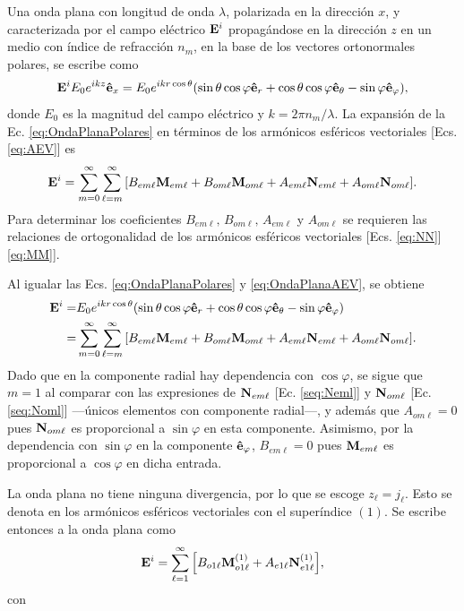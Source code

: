 
Una onda plana con longitud de onda $\lambda$, polarizada en la dirección $x$, y caracterizada por el campo eléctrico $\vb{E}^i$ propagándose en la dirección $z$ en un medio con índice de refracción $n_m$, en la base de los vectores ortonormales polares, se escribe como
	\begin{align}
	\vb{E}^i E_0 e^{ikz}\vu{e}_x =  E_0 e^{ikr\cos\theta} \qty(\sin\theta\cos\varphi \vu{e}_r + 
	\cos\theta\cos\varphi\vu{e}_\theta-\sin\varphi\vu{e}_\varphi),\label{eq:OndaPlanaPolares}
	\end{align}
donde $E_0$ es la magnitud del campo eléctrico y $k=2\pi n_m/\lambda$. La expansión de la Ec. \eqref{eq:OndaPlanaPolares} en términos de los armónicos esféricos vectoriales [Ecs. \eqref{eq:AEV}] es
	\begin{equation}
	\vb{E}^i = \sum_{m=0}^\infty\sum_{\ell=m}^\infty
			\qty[B_{em\ell}\vb{M}_{em\ell} + B_{om\ell}\vb{M}_{om\ell} +
				A_{em\ell}\vb{N}_{em\ell} + A_{om\ell}\vb{N}_{om\ell}].\label{eq:OndaPlanaAEV}
	\end{equation}
Para determinar los coeficientes $B_{em\ell},\, B_{om\ell},\, A_{em\ell}$ y $ A_{om\ell}$ se requieren las relaciones de ortogonalidad de los armónicos esféricos vectoriales [Ecs. \eqref{eq:NN}] \eqref{eq:MM}].

Al igualar las Ecs. \eqref{eq:OndaPlanaPolares} y \eqref{eq:OndaPlanaAEV}, se obtiene
	\begin{align*}
\vb{E}^i = & E_0 e^{ikr\cos\theta} \qty(\sin\theta\cos\varphi \vu{e}_r + 
								\cos\theta\cos\varphi\vu{e}_\theta-\sin\varphi\vu{e}_\varphi)\\
	 =& \sum_{m=0}^\infty\sum_{\ell=m}^\infty \qty[ B_{em\ell}\vb{M}_{em\ell} 
	 	+ B_{om\ell}\vb{M}_{om\ell} +A_{em\ell}\vb{N}_{em\ell} + A_{om\ell}\vb{N}_{om\ell}].
	\end{align*}
Dado que en la componente radial hay dependencia con $\cos\varphi$, se sigue que $m=1$ al comparar con las expresiones de $\vb{N}_{em\ell}$ [Ec. \eqref{seq:Neml}] y $\vb{N}_{om\ell}$ [Ec. \eqref{seq:Noml}] ---únicos elementos con componente radial---, y además que $A_{om\ell}=0$ pues $\vb{N}_{om\ell}$ es proporcional a $\sin\varphi$ en esta componente. Asimismo, por la dependencia con $\sin\varphi$ en la componente  $\vu{e}_\varphi$, $B_{em\ell}=0$ pues $\vb{M}_{em\ell}$ es proporcional a $\cos\varphi$ en dicha entrada. 

La onda plana no tiene ninguna divergencia, por lo que se escoge $z_\ell = j_\ell$. Esto se denota en los armónicos esféricos vectoriales con el superíndice $(1)$. Se escribe entonces a la onda plana como
	\begin{equation}
	\vb{E}^i = \sum_{\ell=1}^\infty \qty[B_{o1\ell}\vb{M}_{o1\ell}^{(1)} + A_{e1\ell}\vb{N}_{e1\ell}^{(1)}],
	\end{equation}
con


